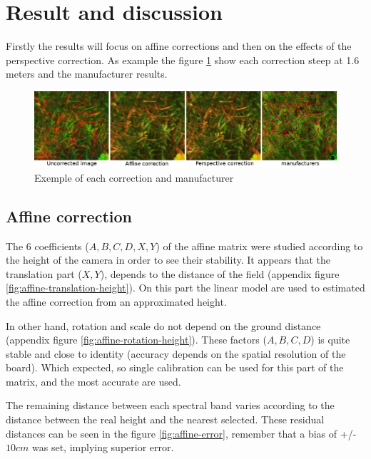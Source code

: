 \documentclass[]{elsarticle}
\begin{document}
	\section{Result and discussion}
	
	Firstly the results will focus on affine corrections and then on the effects of the perspective correction.
	As example the figure \ref{fig:merged-correction} show each correction steep at 1.6 meters and the manufacturer results.
	
	\begin{figure}[H]
		\centering
		\includegraphics[width=0.7\linewidth]{../figures/merged-correction.png}
		\caption{Exemple of each correction and manufacturer}
		\label{fig:merged-correction}
	\end{figure}
	
	\subsection{Affine correction}
	
	The 6 coefficients ($A,B,C,D,X,Y$) of the affine matrix were studied according to the height of the camera in order to see their stability.
	It appears that the translation part ($X,Y$), depends to the distance of the field (appendix figure \ref{fig:affine-translation-height}).
	On this part the linear model are used to estimated the affine correction from an approximated height.

	In other hand, rotation and scale do not depend on the ground distance (appendix figure \ref{fig:affine-rotation-height}).
	These factors ($A,B,C,D$) is quite stable and close to identity (accuracy depends on the spatial resolution of the board).
	Which expected, so single calibration can be used for this part of the matrix, and the most accurate are used.
	
	The remaining distance between each spectral band varies according to the distance between the real height and the nearest selected.
	These residual distances can be seen in the figure \ref{fig:affine-error},
	remember that a bias of +/- $10cm$ was set, implying superior error.
	
\end{document}
